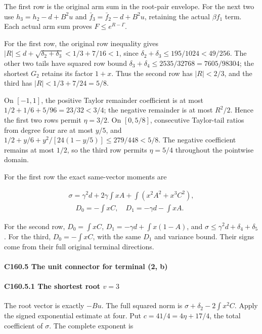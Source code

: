 The first row is the original arm sum in the root-pair envelope. For the next two use \(h_3=h_2-d+B^2u\) and \(\bar f_3=\bar f_2-d+B^2u\), retaining the actual \(\beta f_1\) term. Each actual arm sum proves \(F\le e^{R-\Gamma}\).

For the first row, the original row inequality gives \(|R|\le d+\sqrt{\delta_2+\delta_3}<1/3+7/16<1\), since \(\delta_2+\delta_3\le195/1024<49/256\). The other two tails have squared row bound \(\delta_3+\delta_4\le2535/32768=7605/98304\); the shortest \(G_2\) retains its factor \(1+x\). Thus the second row has \(|R|<2/3\), and the third has \(|R|<1/3+7/24=5/8\).

On \([-1,\allowbreak \allowbreak  1]\), the positive Taylor remainder coefficient is at most \(1/2+1/6+5/96=23/32<3/4\); the negative remainder is at most \(R^2/2\). Hence the first two rows permit \(\eta=3/2\). On \([0,\allowbreak \allowbreak  5/8]\), consecutive Taylor-tail ratios from degree four are at most \(y/5\), and \(1/2+y/6+y^2/[24(1-y/5)]\le279/448<5/8\). The negative coefficient remains at most \(1/2\), so the third row permits \(\eta=5/4\) throughout the pointwise domain.

For the first row the exact same-vector moments are

\[
\begin{gathered}
\sigma=\gamma^2d+2\gamma\int xA+\int(x^2A^2+x^3C^2),\\
\quad D_0=-\int xC,\quad D_1=-\gamma d-\int xA.
\end{gathered}
\]

For the second row, \(D_0=\int xC\), \(D_1=-\gamma d+\int x(1-A)\), and \(\sigma\le\gamma^2d+\delta_4+\delta_5\). For the third, \(D_0=-\int xC\), with the same \(D_1\) and variance bound. Their signs come from their full original terminal directions.

\paragraph{C160.5 The unit connector for terminal (2, b)}

\paragraph{C160.5.1 The shortest root \(v=3\)}

The root vector is exactly \(-Bu\). The full squared norm is \(\sigma+\delta_2-2\int x^2C\). Apply the signed exponential estimate at four. Put \(c=41/4=4\eta+17/4\), the total coefficient of \(\sigma\). The complete exponent is


